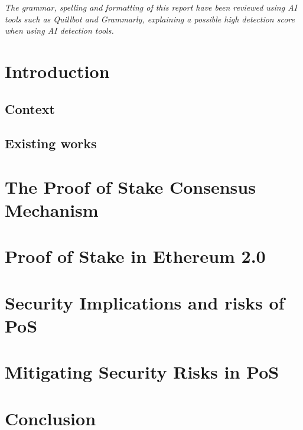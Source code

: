 \documentclass[a4paper]{article}
\begin{document}
%   


\tableofcontents

\vfill
\textit{The grammar, spelling and formatting of this report have been reviewed using AI tools such as Quillbot and Grammarly, explaining a possible high detection score when using AI detection tools.}

\newpage
\section{Introduction}

\subsection{Context}

\subsection{Existing works}

\newpage
\section{The Proof of Stake Consensus Mechanism}

\section{Proof of Stake in Ethereum 2.0}

\section{Security Implications and risks of PoS}

\section{Mitigating Security Risks in PoS}

\newpage
\section{Conclusion}

\newpage
\printbibliography

%
\end{document}
